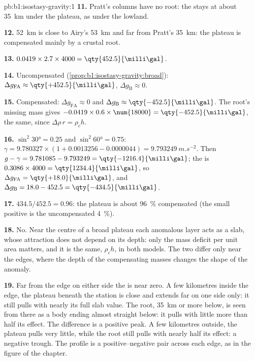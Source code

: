 \begin{solution}{pb:b1:isostasy-gravity:1}
\textbf{11.} Pratt's columns have no root: the  stays at about \qty{35}{km}
under the plateau, as under the lowland.

\textbf{12.} \qty{52}{km} is close to Airy's \qty{53}{km} and far from Pratt's
\qty{35}{km}: the plateau is compensated mainly by a crustal root.

\textbf{13.} $0.0419\times2.7\times4000 = \qty{452.5}{\milli\gal}$.

\textbf{14.} Uncompensated (\cref{prop:b1:isostasy-gravity:broad}):
$\Delta g_{\mathrm{FA}} \approx \qty{+452.5}{\milli\gal}$,
$\Delta g_{\mathrm B} \approx 0$.

\textbf{15.} Compensated: $\Delta g_{\mathrm{FA}} \approx 0$ and
$\Delta g_{\mathrm B} \approx \qty{-452.5}{\milli\gal}$. The root's missing mass
gives $-0.0419\times0.6\times\num{18000} = \qty{-452.5}{\milli\gal}$, the same,
since $\Delta\rho\,r = \rho_c h$.

\textbf{16.} $\sin^2\ang{30} = 0.25$ and $\sin^2\ang{60} = 0.75$:
$\gamma = 9.780327\times(1 + 0.0013256 - 0.0000044) = \qty{9.793249}{m.s^{-2}}$.
Then $g - \gamma = 9.781085 - 9.793249 = \qty{-1216.4}{\milli\gal}$; the  is $0.3086\times4000 = \qty{1234.4}{\milli\gal}$, so
$\Delta g_{\mathrm{FA}} = \qty{+18.0}{\milli\gal}$, and
$\Delta g_{\mathrm B} = 18.0 - 452.5 = \qty{-434.5}{\milli\gal}$.

\textbf{17.} $434.5/452.5 = 0.96$: the plateau is about \qty{96}{\percent}
compensated (the small positive  is the uncompensated
\qty{4}{\percent}).

\textbf{18.} No. Near the centre of a broad plateau each anomalous layer acts
as a slab, whose attraction does not depend on its depth: only the mass deficit
per unit area matters, and it is the same, $\rho_c h$, in both models. The two
differ only near the edges, where the depth of the compensating masses changes
the shape of the anomaly.

\textbf{19.} Far from the edge on either side the  is near zero.
A few kilometres inside the edge, the plateau beneath the station is close and
extends far on one side only: it still pulls with nearly its full slab value.
The root, \qty{35}{km} or more below, is seen from there as a body ending
almost straight below: it pulls with little more than half its effect. The
difference is a positive peak. A few kilometres outside, the plateau pulls
very little, while the root still pulls with nearly half its effect: a negative
trough. The profile is a positive--negative pair across each edge, as in the
figure of the chapter.


\end{solution}
